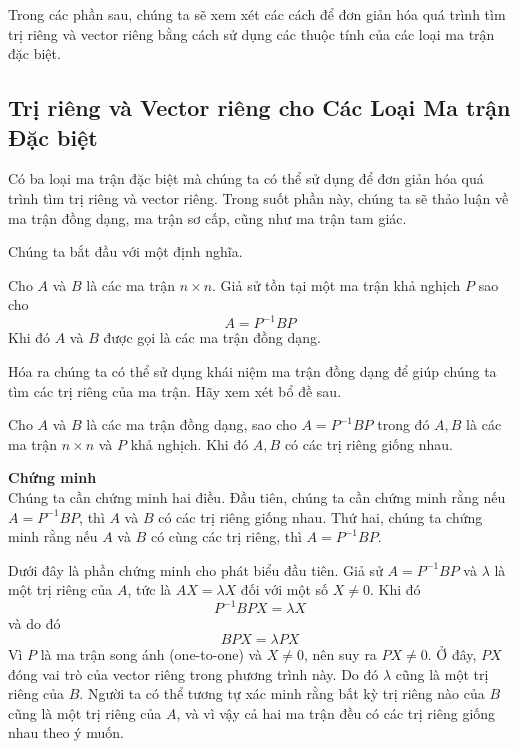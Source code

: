 Trong các phần sau, chúng ta sẽ xem xét các cách để đơn giản hóa quá trình tìm trị riêng và vector riêng bằng cách sử dụng các thuộc tính của các loại ma trận đặc biệt.

\subsection{Trị riêng và Vector riêng cho Các Loại Ma trận Đặc biệt}
Có ba loại ma trận đặc biệt mà chúng ta có thể sử dụng để đơn giản hóa quá trình tìm trị riêng và vector riêng. Trong suốt phần này, chúng ta sẽ thảo luận về ma trận đồng dạng, ma trận sơ cấp, cũng như ma trận tam giác.

Chúng ta bắt đầu với một định nghĩa.

\begin{tcolorbox}[title={Định nghĩa: Ma trận Đồng dạng (Similar Matrices)}]
Cho $A$ và $B$ là các ma trận $n\times n$. Giả sử tồn tại một ma trận khả nghịch $P$ sao cho
\begin{equation*}
A=P^{-1}BP
\end{equation*}
Khi đó $A$ và $B$ được gọi là các ma trận đồng dạng.
\end{tcolorbox}

Hóa ra chúng ta có thể sử dụng khái niệm ma trận đồng dạng để giúp chúng ta tìm các trị riêng của ma trận. Hãy xem xét bổ đề sau.

\begin{tcolorbox}[title={Bổ đề: Ma trận Đồng dạng và Trị riêng}]
Cho $A$ và $B$ là các ma trận đồng dạng, sao cho $A=P^{-1}BP$ trong đó $A, B$ là các ma trận $n\times n$ và $P$ khả nghịch. Khi đó $A, B$ có các trị riêng giống nhau.
\end{tcolorbox}
\textbf{Chứng minh} \\
Chúng ta cần chứng minh hai điều. Đầu tiên, chúng ta cần chứng minh rằng nếu $A=P^{-1}BP$, thì $A$ và $B$ có các trị riêng giống nhau. Thứ hai, chúng ta chứng minh rằng nếu $A$ và $B$ có cùng các trị riêng, thì $A=P^{-1}BP$.

Dưới đây là phần chứng minh cho phát biểu đầu tiên. Giả sử $A=P^{-1}BP$ và $\lambda$ là một trị riêng của $A$, tức là $AX=\lambda X$ đối với một số $X\ne0$. Khi đó
\begin{equation*}
P^{-1}BPX=\lambda X
\end{equation*}
và do đó
\begin{equation*}
BPX=\lambda PX
\end{equation*}
Vì $P$ là ma trận song ánh (one-to-one) và $X\ne0$, nên suy ra $PX\ne0$. Ở đây, $PX$ đóng vai trò của vector riêng trong phương trình này. Do đó $\lambda$ cũng là một trị riêng của $B$. Người ta có thể tương tự xác minh rằng bất kỳ trị riêng nào của $B$ cũng là một trị riêng của $A$, và vì vậy cả hai ma trận đều có các trị riêng giống nhau theo ý muốn.

